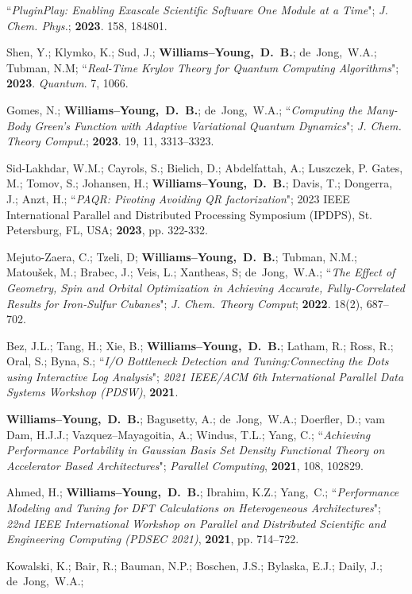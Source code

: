 \documentclass[10pt]{res} %
\newcommand*\me[0]{{\bf Williams--Young,~D.~B.}}
\newcommand*\cy[0]{Yang,~C.}
\newcommand*\bdj[0]{de~Jong,~W.A.}
\begin{document}
\begin{resume}
\begin{etaremune}
       ``\emph{PluginPlay: Enabling Exascale Scientific Software One Module at a Time}";
        \emph{J. Chem. Phys.}; \textbf{2023}. 158, 184801. 
  \item Shen, Y.; Klymko, K.; Sud, J.; \me; \bdj; Tubman, N.M;
    ``\emph{Real-Time Krylov Theory for Quantum Computing Algorithms}";
    \textbf{2023}. \emph{Quantum}. 7, 1066.
  \item Gomes, N.; \me;  \bdj;
    ``\emph{Computing the Many-Body Green's Function with Adaptive Variational 
            Quantum Dynamics}";
    \emph{J. Chem. Theory Comput.}; \textbf{2023}. 19, 11, 3313–3323.
  \item Sid-Lakhdar, W.M.; Cayrols, S.; Bielich, D.; Abdelfattah, A.; Luszczek, P.  Gates, M.; Tomov, S.; 
        Johansen, H.; \me; Davis, T.; Dongerra, J.; Anzt, H.; 
        ``\emph{PAQR: Pivoting Avoiding QR factorization}"; 
        2023 IEEE International Parallel and Distributed Processing Symposium (IPDPS), St. Petersburg, FL, USA; \textbf{2023}, pp. 322-332.
  \item Mejuto-Zaera, C.; Tzeli, D; \me; Tubman, N.M.; Matoušek, M.; Brabec, J.; Veis, L.; Xantheas, S; \bdj; 
       ``\emph{The Effect of Geometry, Spin and Orbital Optimization in Achieving Accurate, Fully-Correlated Results for Iron-Sulfur 
                Cubanes}"; \emph{J. Chem. Theory Comput}; \textbf{2022}. 18(2), 687–702.
  \item Bez, J.L.; Tang, H.; Xie, B.; \me; Latham, R.; Ross, R.; Oral, S.; Byna, S.;
        ``\emph{I/O Bottleneck Detection and Tuning:Connecting the Dots using Interactive Log Analysis}";
        \emph{2021 IEEE/ACM 6th International Parallel Data Systems Workshop (PDSW)}, 
        \textbf{2021}.
  \item \me; Bagusetty, A.; \bdj; Doerfler, D.; vam Dam, H.J.J.; Vazquez--Mayagoitia, A.;
        Windus, T.L.; Yang, C.;
        ``\emph{Achieving Performance Portability in Gaussian Basis Set Density Functional Theory 
                on Accelerator Based Architectures}"; \emph{Parallel Computing},
        \textbf{2021}, 108, 102829.
  \item Ahmed, H.; \me; Ibrahim, K.Z.; \cy;
        ``\emph{Performance Modeling and Tuning for DFT Calculations on Heterogeneous Architectures}";
        \emph{22nd IEEE International Workshop on Parallel and Distributed Scientific and Engineering Computing (PDSEC 2021)},
        \textbf{2021}, pp. 714--722.
  \item Kowalski, K.; Bair, R.; Bauman, N.P.; Boschen, J.S.; Bylaska, E.J.; Daily, J.; \bdj; 

\end{etaremune}
\end{resume}
\end{document}
